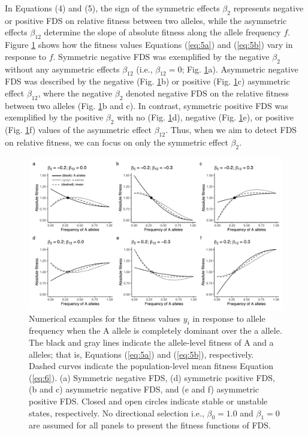 \documentclass[12pt,]{article}
\begin{document}
\noindent
In Equations (4) and (5), the sign of the symmetric effects $\beta_2$ represents negative or positive FDS on relative fitness between two alleles, while the asymmetric effects $\beta_{12}$ determine the slope of absolute fitness along the allele frequency $f$. Figure \ref{fig2:asym} shows how the fitness values Equations (\ref{eq:5a}) and (\ref{eq:5b}) vary in response to $f$. Symmetric negative FDS was exemplified by the negative $\beta_2$ without any asymmetric effects $\beta_{12}$ (i.e., $\beta_{12}=0$; Fig. \ref{fig2:asym}a). Asymmetric negative FDS was described by the negative (Fig. \ref{fig2:asym}b) or positive (Fig. \ref{fig2:asym}c) asymmetric effect $\beta_{12}$, where the negative $\beta_2$ denoted negative FDS on the relative fitness between two alleles (Fig. \ref{fig2:asym}b and c). In contrast, symmetric positive FDS was exemplified by the positive $\beta_2$ with no (Fig. \ref{fig2:asym}d), negative (Fig. \ref{fig2:asym}e), or positive (Fig. \ref{fig2:asym}f) values of the asymmetric effect $\beta_{12}$. Thus, when we aim to detect FDS on relative fitness, we can focus on only the symmetric effect $\beta_2$.

\begin{figure}[ht]
  \includegraphics[width=0.95\linewidth]{AsymFDSdomi.pdf}
  \caption{Numerical examples for the fitness values $y_i$ in response to allele frequency when the A allele is completely dominant over the a allele. The black and gray lines indicate the allele-level fitness of A and a alleles; that is, Equations (\ref{eq:5a}) and (\ref{eq:5b}), respectively. Dashed curves indicate the population-level mean fitness  Equation (\ref{eq:6}). (a) Symmetric negative FDS, (d) symmetric positive FDS, (b and c) asymmetric negative FDS, and (e and f) asymmetric positive FDS. Closed and open circles indicate stable or unstable states, respectively. No directional selection i.e., $\beta_0=1.0$ and $\beta_1=0$ are assumed for all panels to present the fitness functions of FDS.}
  \label{fig2:asym}
\end{figure}
\end{document}
